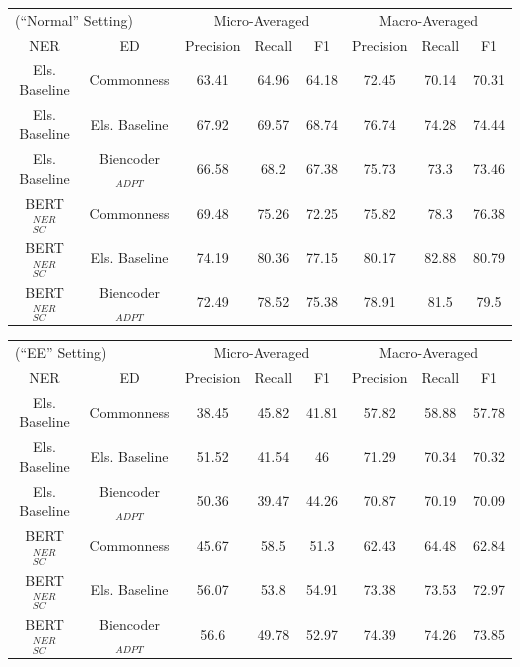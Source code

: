 \documentclass{report}
\theoremstyle{definition}
\theoremstyle{remark}
\begin{document}
\begin{table}
    \centering
    \begin{tabular}{c c c c c| c c c}
    \multicolumn{2}{l}{(``Normal'' Setting)}&\multicolumn{3}{c|}{Micro-Averaged}&\multicolumn{3}{c}{Macro-Averaged} \\
    NER & ED &Precision&Recall&F1&Precision&Recall&F1\\
    \hline
    Els. Baseline & Commonness & 63.41&64.96&64.18&72.45&70.14&	70.31\\
    Els. Baseline & Els. Baseline & 67.92&69.57&68.74&76.74&74.28&	74.44\\
    Els. Baseline & Biencoder$_{ADPT}$ &66.58&68.2&67.38&75.73&73.3&	73.46\\
    BERT$_{SC}^{NER}$ & Commonness & 69.48&75.26&72.25&75.82&78.3&	76.38\\
    BERT$_{SC}^{NER}$ & Els. Baseline & 74.19&80.36&77.15&80.17&82.88&	80.79\\
    BERT$_{SC}^{NER}$ & Biencoder$_{ADPT}$ &72.49&78.52&75.38&78.91&81.5&	79.5\\
    \end{tabular}
    
    \vspace{0.5cm}\begin{tabular}{c c c c c| c c c}
    \multicolumn{2}{l}{(``EE'' Setting)}&\multicolumn{3}{c|}{Micro-Averaged}&\multicolumn{3}{c}{Macro-Averaged} \\
    NER & ED &Precision&Recall&F1&Precision&Recall&F1\\
    \hline
    Els. Baseline & Commonness & 38.45&	45.82&41.81&	57.82&58.88&	57.78\\
    Els. Baseline & Els. Baseline &51.52&	41.54&46	 & 71.29&70.34  & 70.32 \\
    Els. Baseline & Biencoder$_{ADPT}$ &50.36&	39.47&44.26&	70.87&70.19&	70.09\\
    BERT$_{SC}^{NER}$ & Commonness & 45.67&	58.5&51.3&	62.43&64.48&	62.84\\
    BERT$_{SC}^{NER}$ & Els. Baseline &56.07&	53.8&54.91&	73.38&73.53&	72.97 \\
    BERT$_{SC}^{NER}$ & Biencoder$_{ADPT}$ &56.6&	49.78&52.97&	74.39&74.26&	73.85\\
    \end{tabular}
    

\end{table}
\end{document}
